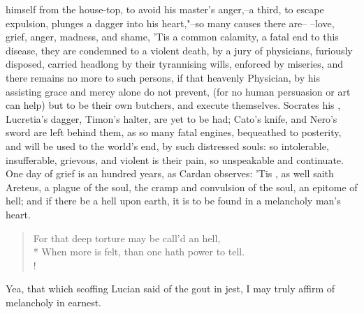 himself from the house-top, to avoid his master's anger,--a third, to escape
expulsion, plunges a dagger into his heart,"--so many causes there are--
 --love, grief, anger, madness, and shame,
\etc{} 'Tis a common calamity, a fatal end to this
disease, they are condemned to a violent death, by a jury of physicians,
furiously disposed, carried headlong by their tyrannising wills, enforced by
miseries, and there remains no more to such persons, if that heavenly
Physician, by his assisting grace and mercy alone do not prevent, (for no human
persuasion or art can help) but to be their own butchers, and execute
themselves. Socrates his , Lucretia's dagger, Timon's halter, are
yet to be had; Cato's knife, and Nero's sword are left behind them, as so many
fatal engines, bequeathed to posterity, and will be used to the world's end, by
such distressed souls: so intolerable, insufferable, grievous, and violent is
their pain, so unspeakable and continuate. One day of
grief is an hundred years, as Cardan observes: 'Tis , as well saith Areteus, a plague of the soul, the cramp and
convulsion of the soul, an epitome of hell; and if there be a hell upon earth,
it is to be found in a melancholy man's heart.

\begin{verse}%
For that deep torture may be call'd an hell,\\*
When more is felt, than one hath power to tell.\\!
\end{verse}%

Yea, that which scoffing Lucian said of the gout in jest, I may truly affirm of melancholy in earnest.

